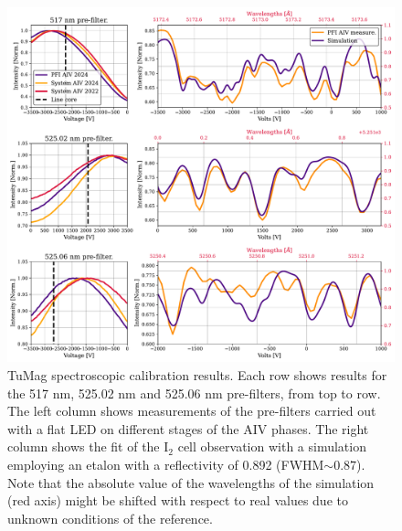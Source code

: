 \begin{figure}
    \includegraphics[width=\textwidth]{figures/TuMag/Spectroscopic_calibration.pdf}
    \caption{
      TuMag spectroscopic calibration results. Each row shows results for the 517 nm, 525.02 nm and 525.06 nm pre-filters, from top to row. The left column shows measurements of the pre-filters carried out with a flat LED on different stages of the AIV phases. The right column shows the fit of the I$_2$ cell observation with a simulation employing an etalon with a reflectivity of 0.892 (FWHM$\sim 0.87$). Note that the absolute value of the wavelengths of the simulation (red axis) might be shifted with respect to real values due to unknown conditions of the reference.   
      \label{fig_tumag: spectroscopic_results}}
\end{figure}

